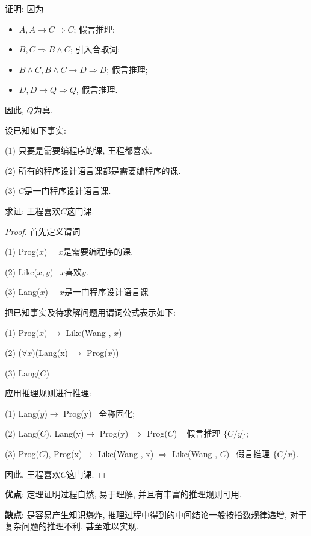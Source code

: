 证明: 因为
\begin{itemize}
\item $A, A\rightarrow C\Rightarrow  C$;                    假言推理;
\item $B,  C\Rightarrow  B\wedge C$;                        引入合取词;
\item $B\wedge C, B\wedge C\rightarrow D \Rightarrow  D$;  假言推理;
\item $D,  D\rightarrow Q \Rightarrow  Q$,                 假言推理.
\end{itemize}
因此, $Q$为真.
\begin{example}
设已知如下事实:

\quad   (1) 只要是需要编程序的课, 王程都喜欢.

\quad   (2) 所有的程序设计语言课都是需要编程序的课.

\quad   (3) $C$是一门程序设计语言课.

求证: 王程喜欢$C$这门课.
\end{example}

\begin{proof}
首先定义谓词

\quad   (1) Prog($x$)   \,\,\,\,    $x$是需要编程序的课.

\quad   (2) Like($x, y$)\,\,\,    $x$喜欢$y$.

\quad   (3) Lang($x$)   \,\,\,\,    $x$是一门程序设计语言课

把已知事实及待求解问题用谓词公式表示如下:

\quad   (1) Prog($x$) $\rightarrow$ Like(Wang , $x$)

\quad   (2) ($\forall x$)(Lang(x) $\rightarrow$ Prog($x$))

\quad   (3) Lang($C$)

应用推理规则进行推理:

\quad   (1) Lang($y$)$\rightarrow$ Prog(y)\,\,\,   全称固化;

\quad   (2) Lang($C$), Lang(y)$\rightarrow$ Prog(y) $\Rightarrow$  Prog($C$) \,\,\,  假言推理  $\{C/y\}$;

\quad   (3) Prog($C$),  Prog(x)$\rightarrow$ Like(Wang , x) $\Rightarrow$  Like(Wang , $C$)\,\,\,  假言推理 $ \{C/x\}$.

因此, 王程喜欢$C$这门课.
\end{proof}

\begin{remark}
\textcolor[rgb]{0,0,1}{\textbf{优点}}: 定理证明过程自然, 易于理解, 并且有丰富的推理规则可用.

\textcolor[rgb]{0,0,1}{\textbf{缺点}}: 是容易产生知识爆炸, 推理过程中得到的中间结论一般按指数规律递增, 对于复杂问题的推理不利, 甚至难以实现.
\end{remark}

